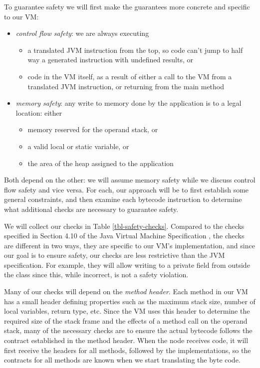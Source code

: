 To guarantee safety we will first make the guarantees more concrete and specific to our VM:

\begin{itemize}
	\item \emph{control flow safety}: we are always executing
		\begin{itemize}
			\item a translated JVM instruction from the top, so code can't jump to half way a generated instruction with undefined results, or
			\item code in the VM itself, as a result of either a call to the VM from a translated JVM instruction, or returning from the main method
		\end{itemize}
	\item \emph{memory safety}: any write to memory done by the application is to a legal location: either
		\begin{itemize}
			\item memory reserved for the operand stack, or
			\item a valid local or static variable, or
			\item the area of the heap assigned to the application
		\end{itemize}
\end{itemize}

Both depend on the other: we will assume memory safety while we discuss control flow safety and vice versa. For each, our approach will be to first establish some general constraints, and then examine each bytecode instruction to determine what additional checks are necessary to guarantee safety.

We will collect our checks in Table \ref{tbl-safety-checks}. Compared to the checks specified in Section 4.10 of the Java Virtual Machine Specification \cite{Lindholm:2017vu}, the checks are different in two ways, they are specific to our VM's implementation, and since our goal is to ensure safety, our checks are less restrictive than the JVM specification. For example, they will allow writing to a private field from outside the class since this, while incorrect, is not a safety violation. 

Many of our checks will depend on the \emph{method header}. Each method in our VM has a small header defining properties such as the maximum stack size, number of local variables, return type, etc. Since the VM uses this header to determine the required size of the stack frame and the effects of a method call on the operand stack, many of the necessary checks are to ensure the actual bytecode follows the contract established in the method header. When the node receives code, it will first receive the headers for all methods, followed by the implementations, so the contracts for all methods are known when we start translating the byte code.

